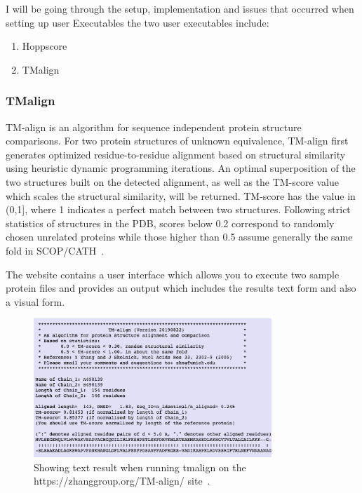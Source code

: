 \documentclass[]{final_report}
\begin{document}
I will be going through the setup, implementation and issues that occurred when setting up user Executables the two user executables include:

\begin{enumerate}
    \item Hoppscore
    \item TMalign
\end{enumerate}

\subsubsection{TMalign}

TM-align is an algorithm for sequence independent protein structure comparisons. For two protein structures of unknown equivalence, TM-align first generates optimized residue-to-residue alignment based on structural similarity using heuristic dynamic programming iterations. An optimal superposition of the two structures built on the detected alignment, as well as the TM-score value which scales the structural similarity, will be returned. TM-score has the value in (0,1], where 1 indicates a perfect match between two structures. Following strict statistics of structures in the PDB, scores below 0.2 correspond to randomly chosen unrelated proteins while those higher than 0.5 assume generally the same fold in SCOP/CATH~\cite{zhang_tm-align_nodate}.

The website contains a user interface which allows you to execute two sample protein files and provides an output which includes the results text form and also a visual form.

\begin{figure}[ht]
    \centering
    \includegraphics[width=0.8\textwidth]{TmalignResult.png}
    \caption{\label{fig:TmalignResult}Showing text result when running tmalign on the https://zhanggroup.org/TM-align/ site~\cite{zhang_tm-align_nodate}.}
\end{figure}
\end{document}
